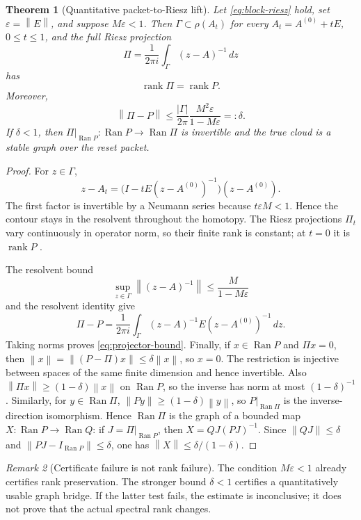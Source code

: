 \documentclass[11pt]{article}
\newtheorem{theorem}{Theorem}[section]
\theoremstyle{definition}
\theoremstyle{remark}
\newtheorem{remark}[theorem]{Remark}
\newcommand{\rank}{\operatorname{rank}}
\newcommand{\Ran}{\operatorname{Ran}}
\newcommand{\norm}[1]{\left\lVert#1\right\rVert}
\begin{document}
\begin{theorem}[Quantitative packet-to-Riesz lift]\label{thm:riesz-lift}
Let \eqref{eq:block-riesz} hold, set $\varepsilon=\norm E$, and suppose
$M\varepsilon<1$.  Then $\Gamma\subset\rho(A_t)$ for every
$A_t=A^{(0)}+tE$, $0\leq t\leq1$, and the full Riesz projection
\[
 \Pi=\frac{1}{2\pi i}\int_\Gamma(z-A)^{-1}\,dz
\]
has
\[
 \rank\Pi=\rank P.
\]
Moreover,
\begin{equation}\label{eq:projector-bound}
 \norm{\Pi-P}
 \leq \frac{|\Gamma|}{2\pi}
 \frac{M^2\varepsilon}{1-M\varepsilon}
 =:\delta.
\end{equation}
If $\delta<1$, then $\Pi|_{\Ran P}:\Ran P\to\Ran\Pi$ is invertible and the
true cloud is a stable graph over the reset packet.
\end{theorem}
\begin{proof}
For $z\in\Gamma$,
\[
 z-A_t=\bigl(I-tE(z-A^{(0)})^{-1}\bigr)(z-A^{(0)}).
\]
The first factor is invertible by a Neumann series because
$t\varepsilon M<1$.  Hence the contour stays in the resolvent throughout the
homotopy.  The Riesz projections $\Pi_t$ vary continuously in operator norm,
so their finite rank is constant; at $t=0$ it is $\rank P$
\citep{Kato1995}.

The resolvent bound
\[
 \sup_{z\in\Gamma}\norm{(z-A)^{-1}}
 \leq\frac{M}{1-M\varepsilon}
\]
and the resolvent identity give
\[
 \Pi-P=\frac{1}{2\pi i}\int_\Gamma
 (z-A)^{-1}E(z-A^{(0)})^{-1}\,dz.
\]
Taking norms proves \eqref{eq:projector-bound}.  Finally, if
$x\in\Ran P$ and $\Pi x=0$, then
$\norm x=\norm{(P-\Pi)x}\leq\delta\norm x$, so $x=0$.  The restriction is
injective between spaces of the same finite dimension and hence invertible.
Also $\norm{\Pi x}\geq(1-\delta)\norm x$ on $\Ran P$, so the inverse has
norm at most $(1-\delta)^{-1}$.  Similarly, for $y\in\Ran\Pi$,
$\norm{Py}\geq(1-\delta)\norm y$, so $P|_{\Ran\Pi}$ is the inverse-direction
isomorphism.  Hence $\Ran\Pi$ is the graph of a bounded map
$X:\Ran P\to\Ran Q$: if $J=\Pi|_{\Ran P}$, then
$X=QJ(PJ)^{-1}$.  Since $\norm{QJ}\leq\delta$ and
$\norm{PJ-I_{\Ran P}}\leq\delta$, one has
$\norm X\leq\delta/(1-\delta)$.
\end{proof}

\begin{remark}[Certificate failure is not rank failure]
The condition $M\varepsilon<1$ already certifies rank preservation.  The
stronger bound $\delta<1$ certifies a quantitatively usable graph bridge.
If the latter test fails, the estimate is inconclusive; it does not prove
that the actual spectral rank changes.
\end{remark}
\end{document}
